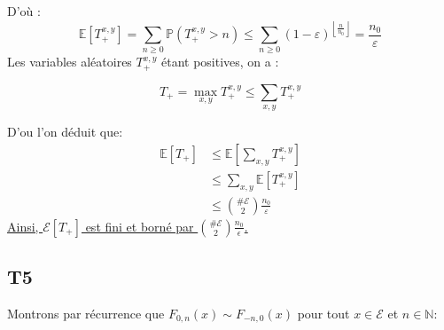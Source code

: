 \documentclass[a4paper,11pt]{article}
\def \P{\mathbb{P}}
\def \E{\mathcal{E}}
\def \esp{\mathbb{E}}
\begin{document}
D'où : 
\[ \esp[T_+^{x,y}]  = \sum_{n\geq 0} \P(T_+^{x,y}>n) \le  \sum_{n\geq 0} (1-\varepsilon)^{\left\lfloor\frac{n}{n_0}\right\rfloor} = \frac{n_0}{\varepsilon} \] 
Les variables aléatoires $T_+^{x,y}$ étant positives, on a :

\[ T_+ = \max_{x,y}  T_+^{x,y} \le \sum_{x,y} T_+^{x,y} \] 

D'ou l'on déduit que:
\begin{equation*}
\begin{split}
\mathbb{E}[T_+] & \le \esp[\sum_{x,y} T_+^{x,y}] \\
		& \le \sum_{x,y} \esp[T_+^{x,y}]  \\
		& \le \binom{\# \E}{2} \frac{n_0}{\varepsilon} 
\end{split}
\end{equation*}
\underline{Ainsi, $\E[T_+]$ est fini et borné par $\binom{\# \E}{2} \frac{n_0}{\epsilon}$.}

\subsection*{T5}
Montrons par récurrence que $F_{0,n}(x) \sim F_{-n,0}(x)$ pour tout $x \in \E$ et $n \in \mathbb{N}$:
\end{document}
